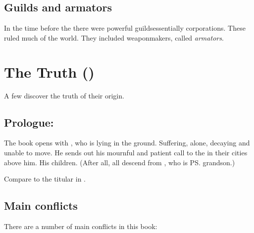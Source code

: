\subsection{Guilds and armators}
In the time before the \secondbanewar there were powerful guilds\dash essentially corporations. 
These ruled much of the world. 
They included weaponmakers, called \emph{armators}. 
















\section{The Truth ()}
A few \resphain{} discover the truth of their origin.









\subsection[Prologue: Semiza]{Prologue: \Semiza}
The book opens with \Semiza, who is lying in the ground. 
Suffering, alone, decaying and unable to move. 
He sends out his mournful and patient call to the \resphain{} in their cities above him. 
His children. 
(After all, all \resphain{} descend from \Thanatzil, who is \ps{\Semiza}{} grandson.)

Compare to the titular  in . 









\subsection{Main conflicts}
There are a number of main conflicts in this book: 

